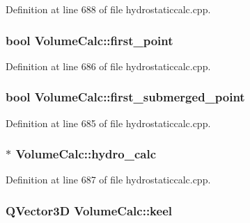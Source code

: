 Definition at line 688 of file hydrostaticcalc.\-cpp.

\hypertarget{structVolumeCalc_ab639da79639aeb33b3aaeb429283f8ca}{
\subsubsection[{first\-\_\-point}]{\setlength{\rightskip}{0pt plus 5cm}bool Volume\-Calc\-::first\-\_\-point}}\label{structVolumeCalc_ab639da79639aeb33b3aaeb429283f8ca}


Definition at line 686 of file hydrostaticcalc.\-cpp.

\hypertarget{structVolumeCalc_a3bc27914e09f86d93cb28daad90dddc1}{
\subsubsection[{first\-\_\-submerged\-\_\-point}]{\setlength{\rightskip}{0pt plus 5cm}bool Volume\-Calc\-::first\-\_\-submerged\-\_\-point}}\label{structVolumeCalc_a3bc27914e09f86d93cb28daad90dddc1}


Definition at line 685 of file hydrostaticcalc.\-cpp.

\hypertarget{structVolumeCalc_a5b3b6d4983faa3c309ddc85981945993}{
\subsubsection[{hydro\-\_\-calc}]{$\ast$ Volume\-Calc\-::hydro\-\_\-calc}}\label{structVolumeCalc_a5b3b6d4983faa3c309ddc85981945993}


Definition at line 687 of file hydrostaticcalc.\-cpp.

\hypertarget{structVolumeCalc_a07e433d13508d3342e7f6a50604c40d3}{
\subsubsection[{keel}]{\setlength{\rightskip}{0pt plus 5cm}Q\-Vector3\-D Volume\-Calc\-::keel}}\label{structVolumeCalc_a07e433d13508d3342e7f6a50604c40d3}


